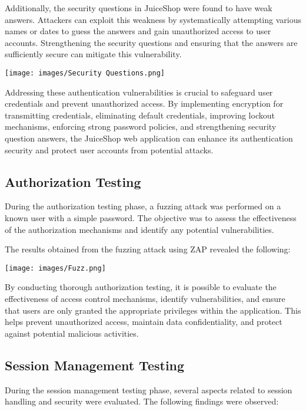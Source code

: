 \documentclass[12pt]{article}
\begin{document}
\newpage

Additionally, the security questions in JuiceShop were found to have weak answers. Attackers can exploit this weakness by systematically attempting various names or dates to guess the answers and gain unauthorized access to user accounts. Strengthening the security questions and ensuring that the answers are sufficiently secure can mitigate this vulnerability.

\begin{center}
    \texttt{[image: images/Security Questions.png]}
\end{center}

Addressing these authentication vulnerabilities is crucial to safeguard user credentials and prevent unauthorized access. By implementing encryption for transmitting credentials, eliminating default credentials, improving lockout mechanisms, enforcing strong password policies, and strengthening security question answers, the JuiceShop web application can enhance its authentication security and protect user accounts from potential attacks.

\newpage

\subsection{Authorization Testing}
During the authorization testing phase, a fuzzing attack was performed on a known user with a simple password. The objective was to assess the effectiveness of the authorization mechanisms and identify any potential vulnerabilities.

The results obtained from the fuzzing attack using ZAP revealed the following:

\begin{center}
    \texttt{[image: images/Fuzz.png]}
\end{center}


By conducting thorough authorization testing, it is possible to evaluate the effectiveness of access control mechanisms, identify vulnerabilities, and ensure that users are only granted the appropriate privileges within the application. This helps prevent unauthorized access, maintain data confidentiality, and protect against potential malicious activities.

\newpage

\subsection{Session Management Testing}
During the session management testing phase, several aspects related to session handling and security were evaluated. The following findings were observed:
\end{document}
